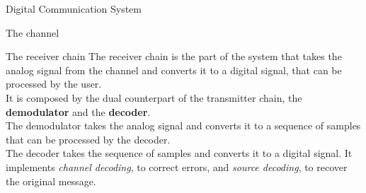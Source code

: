 \begin{section}{Digital Communication System}
\begin{subsection}{The channel}
\end{subsection}
\begin{subsection}{The receiver chain}
The receiver chain is the part of the system that takes the analog signal from the channel and
converts it to a digital signal, that can be processed by the user.\\
It is composed by the dual counterpart of the transmitter chain, the \textbf{demodulator} and the
\textbf{decoder}. \\
The demodulator takes the analog signal and converts it to a sequence of samples that can be
processed by the decoder.\\
The decoder takes the sequence of samples and converts it to a digital signal. It implements
\textit{channel decoding}, to correct errors, and \textit{source decoding}, to recover the original
message.
\end{subsection}
\end{section}

